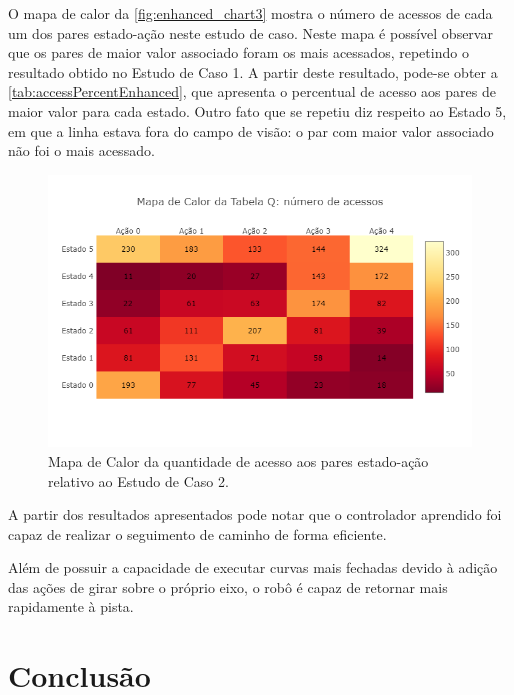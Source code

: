 \documentclass[a4paper]{ifacconf}
\begin{document}
O mapa de calor da \autoref{fig:enhanced_chart3} mostra o número de acessos de cada um dos pares estado-ação neste estudo de caso. Neste mapa é possível observar que os pares de maior valor associado foram os mais acessados, repetindo o resultado obtido no Estudo de Caso 1. A partir deste resultado, pode-se obter a \autoref{tab:accessPercentEnhanced}, que apresenta o percentual de acesso aos pares de maior valor para cada estado. Outro fato que se repetiu diz respeito ao Estado 5, em que a linha estava fora do campo de visão: o par com maior valor associado não foi o mais acessado.

\begin{figure}
\centering 
\caption{Mapa de Calor da quantidade de acesso aos pares estado-ação relativo ao Estudo de Caso 2.} \label{fig:enhanced_chart3}
\includegraphics[scale=0.38]{Figuras/enhanced_chart3.png}
\end{figure}

A partir dos resultados apresentados pode notar que o controlador aprendido foi capaz de realizar o seguimento de caminho de forma eficiente. 

 Além de possuir a capacidade de executar curvas mais fechadas devido à adição das ações de girar sobre o próprio eixo, o robô é capaz de retornar mais rapidamente à pista.

\section{Conclusão}
\end{document}

